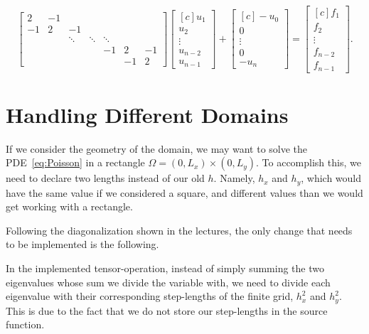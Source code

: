 \documentclass[fontsize=11pt,paper=a4,titlepage]{article}
\begin{document}
\begin{displaymath}
\begin{bmatrix}
	2 & -1 &  &  &  &  &  \\
	-1 & 2 & -1 &  &  &  &  \\
	 &  & \ddots & \ddots & \ddots &  & \\
	 &  &  &  & -1 & 2 & -1 \\
	 &  &  &  &  & -1 & 2
\end{bmatrix}
\begin{bmatrix*}[c]
	u_1 \\
	u_2 \\
	\vdots \\
	u_{n - 2} \\
	u_{n - 1}
\end{bmatrix*}
+ \begin{bmatrix*}[c]
	- u_0 \\
	0 \\
	\vdots \\
	0 \\
	- u_n
\end{bmatrix*}
=
\begin{bmatrix*}[c]
	f_1 \\
	f_2 \\
	\vdots \\
	f_{n - 2} \\
	f_{n - 1}
\end{bmatrix*}.
\end{displaymath}

\section{Handling Different Domains}

If we consider the geometry of the domain, we may want to solve the
PDE~\ref{eq:Poisson} in a rectangle $\Omega = (0, L_x) \times (0, L_y)$. To
accomplish this, we need to declare two lengths instead of our old $h$. Namely,
$h_x$ and $h_y$, which would have the same value if we considered a square, and
different values than we would get working with a rectangle.

Following the diagonalization shown in the lectures, the only change that needs
to be implemented is the following.

In the implemented tensor-operation, instead of simply summing the two
eigenvalues whose sum we divide the variable with, we need to divide each
eigenvalue with their corresponding step-lengths of the finite grid, $h_x^2$ and
$h_y^2$. This is due to the fact that we do not store our step-lengths in the
source function.
\end{document}
